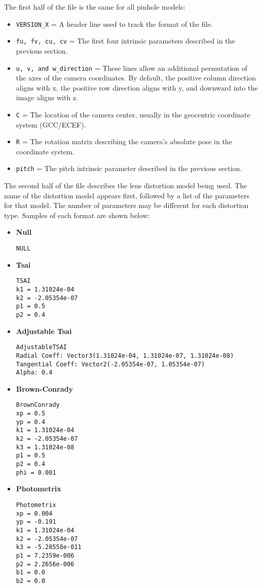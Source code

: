 The first half of the file is the same for all pinhole models:

\begin{itemize}{}
\item  \texttt{VERSION\_X} = A header line used to track the format of the file.
\item  \texttt{fu, fv, cu, cv} = The first four intrinsic parameters described in the previous section.
\item  \texttt{u, v, and w\_direction} = These lines allow an additional permutation of the 
axes of the camera coordinates.  By default, the positive column direction aligns with x, the
positive row direction aligns with y, and downward into the image aligns with z.
\item  \texttt{C} = The location of the camera center, usually in the geocentric coordinate system (GCC/ECEF).
\item  \texttt{R} = The rotation matrix describing the camera's absolute pose in the coordinate system.
\item  \texttt{pitch} = The pitch intrinsic parameter described in the previous section.
\end{itemize}

The second half of the file describes the lens distortion model being used.  The name of the
distortion model appears first, followed by a list of the parameters for that model.  The number
of parameters may be different for each distortion type.  Samples of each format are shown below:

\begin{itemize}{}
\item  \textbf{Null}
\begin{verbatim}
NULL
\end{verbatim}

\item  \textbf{Tsai}
\begin{verbatim}
TSAI
k1 = 1.31024e-04
k2 = -2.05354e-07
p1 = 0.5
p2 = 0.4
\end{verbatim}

\item  \textbf{Adjustable Tsai}
\begin{verbatim}
AdjustableTSAI
Radial Coeff: Vector3(1.31024e-04, 1.31024e-07, 1.31024e-08)
Tangential Coeff: Vector2(-2.05354e-07, 1.05354e-07)
Alpha: 0.4
\end{verbatim}

\item  \textbf{Brown-Conrady}
\begin{verbatim}
BrownConrady
xp = 0.5
yp = 0.4
k1 = 1.31024e-04
k2 = -2.05354e-07
k3 = 1.31024e-08
p1 = 0.5
p2 = 0.4
phi = 0.001
\end{verbatim}

\item  \textbf{Photometrix}
\begin{verbatim}
Photometrix
xp = 0.004
yp = -0.191
k1 = 1.31024e-04
k2 = -2.05354e-07
k3 = -5.28558e-011
p1 = 7.2359e-006
p2 = 2.2656e-006
b1 = 0.0
b2 = 0.0
\end{verbatim}

\end{itemize}{}


